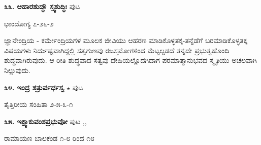 \medskip
\noindent\textbf{೩೩. ಆಹಾರಶುದ್ಧೌ ಸ್ತ್ವಶುದ್ಧಿಃ} \hfill ಪುಟ \pageref{76b}

\hfill ಛಾಂದೋಗ್ಯ ೭-೨೬-೨

ಜ್ಞಾನೇಂದ್ರಿಯ - ಕರ್ಮೇಂದ್ರಿಯಗಳ ಮೂಲಕ ಜೀವಿಯು ಆಹರಣ ಮಾಡಿಕೊಳ್ಳತಕ್ಕ-ತನ್ನೆಡೆಗೆ ಬರಮಾಡಿಕೊಳ್ಳತಕ್ಕ ವಿಷಯಗಳು ನಿರ್ದುಷ್ಟವಾಗಿದ್ದಲ್ಲಿ ಸತ್ವಗುಣವು ರಜಸ್ತಮೋಗಳಿಂದ ಮೆಟ್ಟಲ್ಪಡದೆ ತನ್ನದೇ ಪ್ರಭುತ್ವಹೊಂದಿ ಶುದ್ಧವಾಗಿರುವುದು. ಆ ರೀತಿ ಶುದ್ಧವಾದ ಸತ್ವವು ದೇಹಿಯಲ್ಲೊದಗಿದಾಗ ಪರಮಾತ್ಮಾನುಭವದ ಸ್ಮೃತಿಯು ಅಚಲವಾಗಿ ನಿಲ್ಲುವುದು.

\medskip
\noindent\textbf{೩೪. ಇಂದ್ರ  ಶತ್ರುರ್ವರ್ಧಸ್ವ} $\star$ \hfill ಪುಟ \pageref{9}

\hfill ತೈತ್ತಿರೀಯ ಸಂಹಿತಾ ೨-೫-೩-೧

\medskip
\noindent\textbf{೩೫. ಇಕ್ಷ್ವಾಕುವಂಶಪ್ರಭುವೋ} \hfill ಪುಟ \pageref{154},\pageref{163aa},\pageref{196}

\hfill ರಾಮಾಯಣ ಬಾಲಕಂಡ ೧-೮ ರಿಂದ ೧೮

